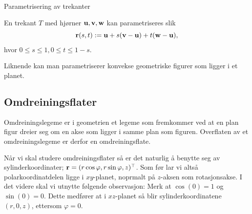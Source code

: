 \begin{eks}{Parametrisering av trekanter}\mbox{}\label{ex:trekant_para}\\
\begin{minipage}{7cm}
En trekant $T$ med hjørner $\mathbf{u},\mathbf{v},\mathbf{w}$ kan parametriseres slik
\[\mathbf{r}(s,t):=\mathbf{u}+s(\mathbf{v}-\mathbf{u})+t(\mathbf{w}-\mathbf{u}),\]
hvor $ 0\leq s\leq 1, 0\leq t\leq 1-s$.

Liknende kan man parametriserer konvekse geometriske figurer som ligger i et planet.
\end{minipage}
\begin{minipage}{7cm}
\end{minipage}
\end{eks}

\subsection{Omdreiningsflater}
Omdreiningslegeme er i geometrien et legeme som fremkommer ved at en plan figur dreier seg om en akse som ligger i samme plan som figuren. Overflaten av et omdreiningslegeme er derfor en omdreiningsflate.

Når vi skal studere omdreiningsflater så er det naturlig å benytte seg av sylinderkoordinater; $\mathbf{r}=(r\cos \varphi ,r \sin \varphi ,z)^\top$. Som før lar vi altså polarkoordinatdelen ligge i $xy$-planet, noprmalt på $z$-aksen som rotasjonsakse. I det videre skal vi utnytte følgende observasjon: Merk at $\cos(0)=1$ og $\sin(0)=0$. Dette medfører at i $xz$-planet så blir sylinderkoordinatene $(r,0,z)$, ettersom $\varphi=0$. 

